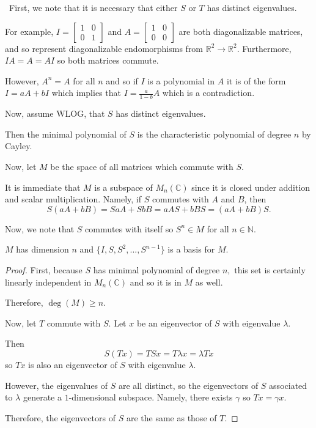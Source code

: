 \documentclass[12pt]{Qual}
\begin{document}
\begin{solution}$\,$
First, we note that it is necessary that either $S$ or $T$ has distinct eigenvalues.

For example, $I=\begin{bmatrix}
1 & 0\\
0 & 1
\end{bmatrix}$ and $A=\begin{bmatrix}
1 & 0\\
0 & 0
\end{bmatrix}$ are both diagonalizable matrices, and so represent diagonalizable endomorphisms from $\mathbb{R}^2\to\mathbb{R}^2$. Furthermore, $IA=A=AI$ so both matrices commute.

However, $A^n=A$ for all $n$ and so if $I$ is a polynomial in $A$ it is of the form $I=aA+bI$ which implies that $I=\frac{a}{1-b}A$ which is a contradiction.

Now, assume WLOG, that $S$ has distinct eigenvalues.

Then the minimal polynomial of $S$ is the characteristic polynomial of degree $n$ by Cayley.

Now, let $M$ be the space of all matrices which commute with $S$.

It is immediate that $M$ is a subspace of $M_n(\mathbb{C})$ since it is closed under addition and scalar multiplication. Namely, if $S$ commutes with $A$ and $B$, then $$S(aA+bB)=SaA+SbB=aAS+bBS=(aA+bB)S.$$

Now, we note that $S$ commutes with itself so $S^n\in M$ for all $n\in\mathbb{N}$.

\begin{claim} $M$ has dimension $n$ and $\{I,S,S^2,...,S^{n-1}\}$ is a basis for $M.$
\begin{proof} First, because $S$ has minimal polynomial of degree $n,$ this set is certainly linearly independent in $M_n(\mathbb{C})$ and so it is in $M$ as well.

Therefore, $\deg(M)\ge n$.

Now, let $T$ commute with $S$. Let $x$ be an eigenvector of $S$ with eigenvalue $\lambda$.

Then $$S(Tx)=TSx=T\lambda x=\lambda Tx$$ so $Tx$ is also an eigenvector of $S$ with eigenvalue $\lambda$.

However, the eigenvalues of $S$ are all distinct, so the eigenvectors of $S$ associated to $\lambda$ generate a $1$-dimensional subspace. Namely, there exists $\gamma$ so $Tx=\gamma x$.

Therefore, the eigenvectors of $S$ are the same as those of $T$.


\end{proof}
\end{claim}
\end{solution}
\end{document}
